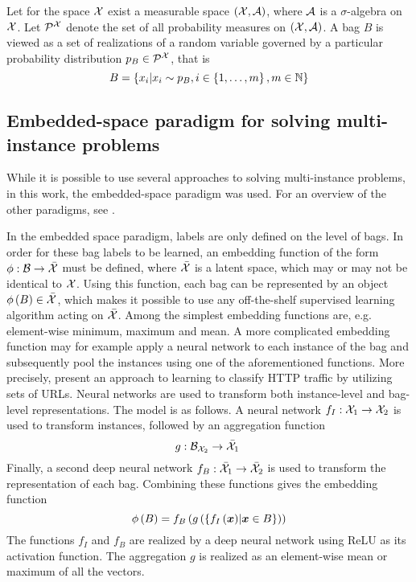Let for the space \( \mathcal{X} \) exist a measurable space \( \left( \mathcal{X}, \mathcal{A} \right) \), where \( \mathcal{A} \) is a \( \sigma \)-algebra on \( \mathcal{X} \). Let \( \mathcal{P}^\mathspace{X} \) denote the set of all probability measures on \( \left( \mathcal{X}, \mathcal{A} \right) \). A bag \( B \) is viewed as a set of realizations of a random variable governed by a particular probability distribution \( p_B \in \mathcal{P}^\mathspace{X} \), that is
\[ B = \left\{ x_i \middle| x_i \sim p_B, i \in \left\{ 1, \dots, m \right\}, m \in \mathbb{N} \right\} \]

\subsection{Embedded-space paradigm for solving multi-instance problems}\label{sec:embedded-space-paradigm}
While it is possible to use several approaches to solving multi-instance problems, in this work, the embedded-space paradigm was used. For an overview of the other paradigms, see \cite{dedic_optimalization_2020}.

In the embedded space paradigm, labels are only defined on the level of bags. In order for these bag labels to be learned, an embedding function of the form \( \phi : \mathcal{B} \to \bar{\mathcal{X}} \) must be defined, where \( \bar{\mathcal{X}} \) is a latent space, which may or may not be identical to \( \mathcal{X} \). Using this function, each bag can be represented by an object \( \phi \left( B \right) \in \bar{\mathcal{X}} \), which makes it possible to use any off-the-shelf supervised learning algorithm acting on \( \bar{\mathcal{X}} \). Among the simplest embedding functions are, e.g. element-wise minimum, maximum and mean. A more complicated embedding function may for example apply a neural network to each instance of the bag and subsequently pool the instances using one of the aforementioned functions. More precisely, \cite{pevny_nested_2020} present an approach to learning to classify HTTP traffic by utilizing sets of URLs. Neural networks are used to transform both instance-level and bag-level representations. The model is as follows. A neural network \( f_I : \mathcal{X}_1 \to \mathcal{X}_2 \) is used to transform instances, followed by an aggregation function
\[ g: \mathcal{B}_{\mathcal{X}_2} \to \bar{\mathcal{X}}_1 \ \]
Finally, a second deep neural network \( f_B : \bar{\mathcal{X}}_1 \to \bar{\mathcal{X}}_2 \) is used to transform the representation of each bag. Combining these functions gives the embedding function
\[ \phi \left( B \right) = f_B \left( g \left( \left\{ f_I \left( \bm{x} \right) \middle| \bm{x} \in B \right\} \right) \right) \]
The functions \( f_I \) and \( f_B \) are realized by a deep neural network using ReLU as its activation function. The aggregation \( g \) is realized as an element-wise mean or maximum of all the vectors.

